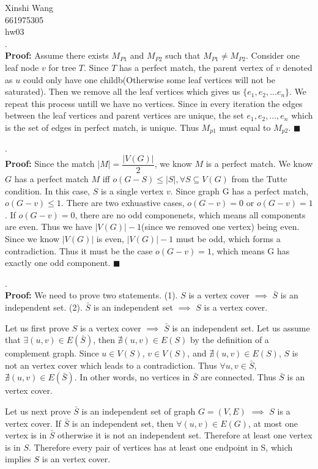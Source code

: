 \documentclass[12pt]{article}
\begin{document}
	\noindent Xinshi Wang\\
	661975305\\
	hw03\\
	
	.\\
	\textbf{Proof:} Assume there exists $M_{P1}$ and $M_{P2}$ such that $M_{P1} \neq M_{P2}$. Consider one leaf node $v$ for tree $T$. Since $T$ has a perfect match, the parent vertex of $v$ denoted as $u$ could only have one childb(Otherwise some leaf vertices will not be saturated). Then we remove all the leaf vertices which gives us $\{e_1,e_2,...e_n\}$. We repeat this process untill we have no vertices. Since in every iteration the edges between the leaf vertices and parent vertices are unique, the set ${e_1,e_2,...,e_n}$ which is the set of edges in perfect match, is unique. Thus $M_{p1}$ must equal to $M_{p2}$.
	\hfill $\blacksquare$
	
	.\\
	\textbf{Proof:} Since the match $|M| = \dfrac{|V(G)|}{2}$, we know $M$ is a perfect match. We know $G$ has a perfect match $M$ iff $o(G-S) \leq |S|, \forall S \subseteq V(G)$ from the Tutte condition. In this case, $S$ is a single vertex $v$. Since graph G has a perfect match, $o(G-v) \leq 1$. There are two exhuastive cases, $o(G-v) = 0$ or $o(G-v) = 1$. If $o(G-v) = 0$, there are no odd componenets, which means all components are even. Thus we have $|V(G)|-1$(since we removed one vertex) being even. Since we know $|V(G)|$ is even, $|V(G)|-1$ must be odd, which forms a contradiction. Thus it must be the case $o(G-v) =1$, which means G has exactly one odd component.
	\hfill $\blacksquare$
	
	.\\
	\textbf{Proof:} We need to prove two statements. (1). $S$ is a vertex cover $\implies$ $\bar{S}$ is an independent set. (2). $\bar{S}$ is an independent set $\implies$ $S$ is a vertex cover.
	
	Let us first prove $S$ is a vertex cover $\implies$ $\bar{S}$ is an independent set. Let us assume that $\exists (u,v) \in E(\bar{S})$, then $\nexists (u,v) \in E(S)$ by the definition of a complement graph. Since $u \in V(S)$, $v \in V(S)$, and $\nexists (u,v) \in E(S)$, $S$ is not an vertex cover which leads to a contradiction. Thus $\forall u,v \in \bar{S}$, $\nexists (u,v) \in E(\bar{S})$. In other words, no vertices in $\bar{S}$ are connected. Thus $\bar{S}$ is an vertex cover.
	
	Let us next prove $\bar{S}$ is an independent set of graph $G = (V,E)$ $\implies$ $S$ is a vertex cover. If $\bar{S}$ is an independent set, then $\forall (u,v) \in E(G)$, at most one vertex is in $\bar{S}$ otherwise it is not an independent set. Therefore at least one vertex is in $S$. Therefore every pair of vertices has at least one endpoint in S, which implies $S$ is an vertex cover.
	
\end{document}
